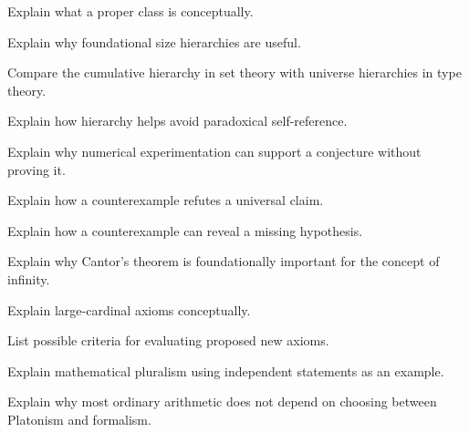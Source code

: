 \begin{exercise}[2]
Explain what a proper class is conceptually.
\end{exercise}

\begin{exercise}[3]
Explain why foundational size hierarchies are useful.
\end{exercise}

\begin{exercise}[3]
Compare the cumulative hierarchy in set theory with universe hierarchies in
type theory.
\end{exercise}

\begin{exercise}[3]
Explain how hierarchy helps avoid paradoxical self-reference.
\end{exercise}

\begin{exercise}[3]
Explain why numerical experimentation can support a conjecture without
proving it.
\end{exercise}

\begin{exercise}[2]
Explain how a counterexample refutes a universal claim.
\end{exercise}

\begin{exercise}[3]
Explain how a counterexample can reveal a missing hypothesis.
\end{exercise}

\begin{exercise}[3]
Explain why Cantor's theorem is foundationally important for the concept of
infinity.
\end{exercise}

\begin{exercise}[3]
Explain large-cardinal axioms conceptually.
\end{exercise}

\begin{exercise}[3]
List possible criteria for evaluating proposed new axioms.
\end{exercise}

\begin{exercise}[3]
Explain mathematical pluralism using independent statements as an example.
\end{exercise}

\begin{exercise}[3]
Explain why most ordinary arithmetic does not depend on choosing between
Platonism and formalism.
\end{exercise}

